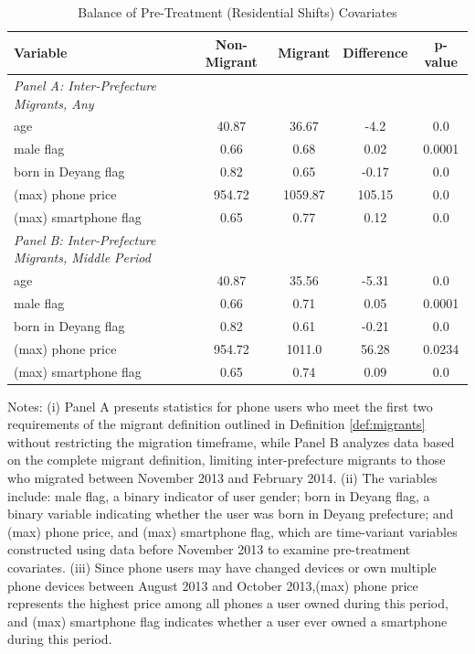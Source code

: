 \clearpage\newpage
\begin{table}[htbp]
\vspace{0.3cm}
\renewcommand{\arraystretch}{1.6}
\setlength{\tabcolsep}{1mm}{}
\centering
\small
\caption{Balance of Pre-Treatment (Residential Shifts) Covariates}

\begin{tabular}{lcccc} \hline
Variable & Non-Migrant & Migrant & Difference & p-value \\ \hline
\textit{Panel A: Inter-Prefecture Migrants, Any} \\
age & 40.87 & 36.67 & -4.2 & 0.0 \\
male flag & 0.66 & 0.68 & 0.02 & 0.0001 \\
born in Deyang flag & 0.82 & 0.65 & -0.17 & 0.0 \\
(max) phone price & 954.72 & 1059.87 & 105.15 & 0.0 \\
(max) smartphone flag & 0.65 & 0.77 & 0.12 & 0.0 \\ \hline

\textit{Panel B: Inter-Prefecture Migrants, Middle Period} \\
age & 40.87 & 35.56 & -5.31 & 0.0 \\
male flag & 0.66 & 0.71 & 0.05 & 0.0001 \\
born in Deyang flag & 0.82 & 0.61 & -0.21 & 0.0 \\
(max) phone price & 954.72 & 1011.0 & 56.28 & 0.0234 \\
(max) smartphone flag & 0.65 & 0.74 & 0.09 & 0.0 \\ \hline

\end{tabular}
\label{tab:non_migrant_migrant_comparison}%

\end{table}%

\vspace{-3em}
\begin{singlespace}
\begin{footnotesize}
\noindent Notes: (i) Panel A presents statistics for phone users who meet the first two requirements of the migrant definition outlined in Definition \ref{def:migrants} without restricting the migration timeframe, while Panel B analyzes data based on the complete migrant definition, limiting inter-prefecture migrants to those who migrated between November 2013 and February 2014. (ii) The variables include: male flag, a binary indicator of user gender; born in Deyang flag, a binary variable indicating whether the user was born in Deyang prefecture; and (max) phone price, and (max) smartphone flag, which are time-variant variables constructed using data before November 2013 to examine pre-treatment covariates. (iii) Since phone users may have changed devices or own multiple phone devices between August 2013 and October 2013,(max) phone price represents the highest price among all phones a user owned during this period, and (max) smartphone flag indicates whether a user ever owned a smartphone during this period.
\end{footnotesize}
\end{singlespace}


